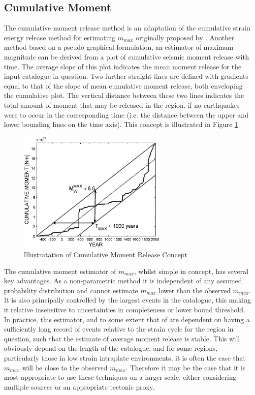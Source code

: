 \subsection{Cumulative Moment \citep{MakropoulosBurton1983}}

The cumulative moment release method is an adaptation of the cumulative strain energy release method for estimating $m_{max}$ originally proposed by \cite{MakropoulosBurton1983}. Another method based on a pseudo-graphical formulation, an estimator of maximum magnitude can be derived from a plot of cumulative seismic moment release with time. The average slope of this plot indicates the mean moment release for the input catalogue in question. Two further straight lines are defined with gradients equal to that of the slope of mean cumulative moment release, both enveloping the cumulative plot. The vertical distance between these two lines indicates the total amount of moment that may be released in the region, if no earthquakes were to occur in the corresponding time (i.e. the distance between the upper and lower bounding lines on the time axis). This concept is illustrated in Figure \ref{fig:Cumulative_Moment}. 

\begin{figure}[htb]
	\centering
		\includegraphics[height=6cm, keepaspectratio=true]{./figures/Cumulative_Moment.eps}
	\caption{Illustratation of Cumulative Moment Release Concept}
	\label{fig:Cumulative_Moment}
\end{figure}

The cumulative moment estimator of $m_{max}$, whilst simple in concept, has several key advantages. As a non-parametric method it is independent of any assumed probability distribution and cannot estimate $m_{max}$ lower than the observed $m_{max}$. It is also principally controlled by the largest events in the catalogue, this making it relative insensitive to uncertainties in completeness or lower bound threshold. In practice, this estimator, and to some extent that of \cite{Kijko2004} are dependent on having a sufficiently long record of events relative to the strain cycle for the region in question, such that the estimate of average moment release is stable. This will obviously depend on the length of the catalogue, and for some regions, particularly those in low strain intraplate environments, it is often the case that $m_{max}$ will be close to the observed $m_{max}$. Therefore it may be the case that it is most appropriate to use these techniques on a larger scale, either considering multiple sources or an appropriate tectonic proxy.

